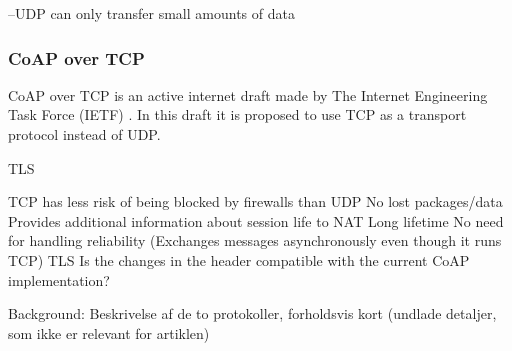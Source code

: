 --UDP can only transfer small amounts of data

\subsubsection{CoAP over TCP}
CoAP over TCP is an active internet draft made by The Internet Engineering Task Force (IETF) \cite{IETF}. 
In this draft it is proposed to use TCP as a transport protocol instead of UDP.

TLS
   
TCP has less risk of being blocked by firewalls than UDP
No lost packages/data
Provides additional information about session life to NAT
Long lifetime
No need for handling reliability
(Exchanges messages asynchronously even though it runs TCP)
TLS
Is the changes in the header compatible with the current CoAP implementation?


Background: Beskrivelse af de to protokoller, forholdsvis kort (undlade detaljer, som ikke er relevant for artiklen)


